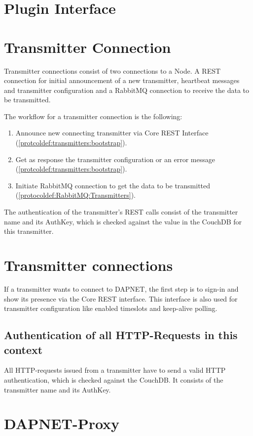 \section{Plugin Interface}

\section{Transmitter Connection}
Transmitter connections consist of two connections to a Node. A REST connection
for initial announcement of a new transmitter, heartbeat messages and
transmitter configuration and a RabbitMQ connection to receive the data to be
transmitted.

The workflow for a transmitter connection is the following:
\begin{enumerate}
\item Announce new connecting transmitter via Core REST Interface (\ref{protcoldef:transmitters:bootstrap}).
\item Get as response the transmitter configuration or an error message (\ref{protcoldef:transmitters:bootstrap}).
\item Initiate RabbitMQ connection to get the data to be transmitted (\ref{protocoldef:RabbitMQ:Transmitters}).
\end{enumerate}

The authentication of the transmitter's REST calls consist of the transmitter
name and its AuthKey, which is checked against the value in the CouchDB for this
transmitter.

\section{Transmitter connections}
If a transmitter wants to connect to DAPNET, the first step is to sign-in and
show its presence via the Core REST interface. This interface is also used for
transmitter configuration like enabled timeslots and keep-alive polling.

\subsection{Authentication of all HTTP-Requests in this context}
All HTTP-requests issued from a transmitter have to send a valid HTTP
authentication, which is checked against the CouchDB. It consists of the
transmitter name and its AuthKey.


\section{DAPNET-Proxy}